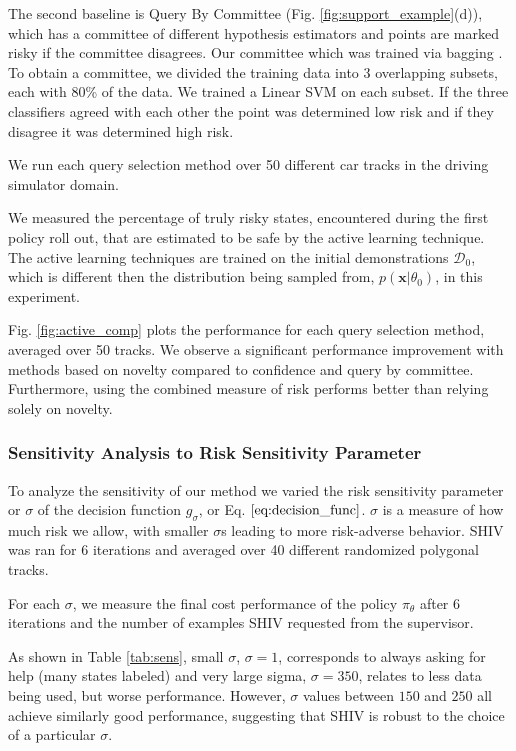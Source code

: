 \documentclass[10pt, conference]{ieeeconf}      %
\newcommand{\bx}{\mathbf{x}}
\begin{document}
The second baseline is Query By Committee (Fig. \ref{fig:support_example}(d)), which has a committee of different hypothesis estimators and points are marked risky if the committee disagrees. Our committee which was trained via bagging \cite{breiman1996bagging}.  To obtain a committee, we divided the training data into 3 overlapping subsets, each with 80\% of the data. We trained a Linear SVM on each subset. If the three classifiers agreed with each other the point was determined low risk and if they disagree it was determined high risk. 

We run each query selection method over 50 different car tracks in the driving simulator domain.

We measured the percentage of truly risky states, encountered during the first policy roll out, that  are estimated to be safe by the active learning technique. The active learning techniques are trained on the initial demonstrations $\mathcal{D}_0$, which is different then the distribution being sampled from, $p(\bx|\theta_0)$, in this experiment.

 Fig. \ref{fig:active_comp}  plots the performance for each query selection method, averaged over 50 tracks. We observe a significant performance improvement with methods based on novelty compared to confidence and query by committee. Furthermore, using the combined measure of risk performs better than relying solely on novelty. 

\subsubsection{Sensitivity Analysis to Risk Sensitivity Parameter}

 To analyze the sensitivity of our method we varied the risk sensitivity  parameter or $\sigma$ of the decision function $g_{\sigma}$, or Eq. $\ref{eq:decision_func}$. $\sigma$ is a measure of how much risk we allow, with smaller $\sigma$s leading to more risk-adverse behavior. SHIV was ran for 6 iterations and averaged over 40 different randomized polygonal tracks. 

 For each  $\sigma$, we measure the final cost performance of the policy $\pi_{\theta}$ after 6 iterations and the number of examples SHIV requested from the supervisor. 

 As shown in Table \ref{tab:sens}, small $\sigma$, $\sigma = 1$, corresponds to always asking for help (many states labeled) and very large sigma, $\sigma = 350$, relates to  less data being used, but worse performance. However, $\sigma$ values between $150$ and $250$ all achieve similarly good performance, suggesting that SHIV is robust to the choice of a particular $\sigma$.
\end{document}
